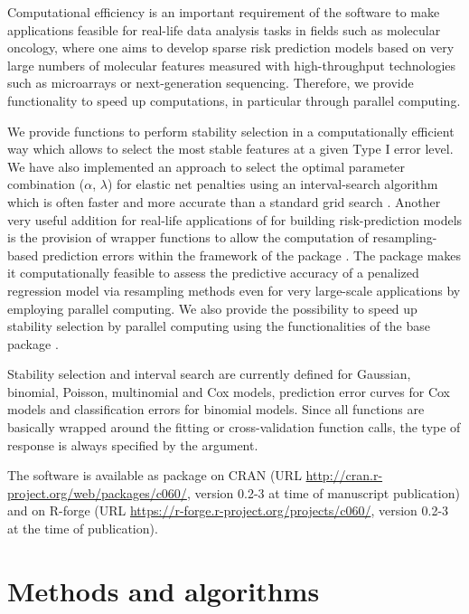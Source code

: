 \documentclass[nojss]{jss}
\begin{document}
Computational efficiency is an important requirement of the software to make applications feasible for real-life data analysis tasks in fields such as molecular oncology, where one aims to develop sparse risk prediction models based on very large numbers of molecular features measured with high-throughput technologies such as microarrays or next-generation sequencing. Therefore, we provide functionality to speed up computations, in particular through parallel computing.

We provide  functions to perform stability selection \citep{MeinshausenBuehlmann2010} in a computationally efficient way which allows to select the most stable features at a given Type I error level. We have also implemented an approach to select the optimal parameter combination ($\alpha$, $\lambda$) for elastic net penalties using an interval-search algorithm \citep{froehlich2005} which is often faster and more accurate than a standard grid search \citep{Jones1998}. Another very useful addition for real-life applications of  for building risk-prediction models is the provision of wrapper functions to allow the computation of resampling-based prediction errors within the framework of the  package  \citep{Porz2009}. The  package makes it computationally feasible to assess the
predictive accuracy of a penalized regression model via resampling methods even for very large-scale applications by employing parallel computing. We also provide the possibility to speed up stability selection by parallel computing using the functionalities of the  base package  \citep{R11}.

Stability selection and interval search are currently defined for Gaussian, binomial, Poisson, multinomial and Cox models,  prediction error curves for Cox models and classification errors for
binomial models. Since all functions are basically wrapped around the  fitting or cross-validation function calls, the type of response is always specified by the  argument. 

The software is available as  package  on CRAN (URL \url{http://cran.r-project.org/web/packages/c060/}, version 0.2-3 at time of manuscript publication) and on R-forge (URL \url{https://r-forge.r-project.org/projects/c060/}, version 0.2-3 at the time of publication).

\section{Methods and algorithms}
\end{document}
